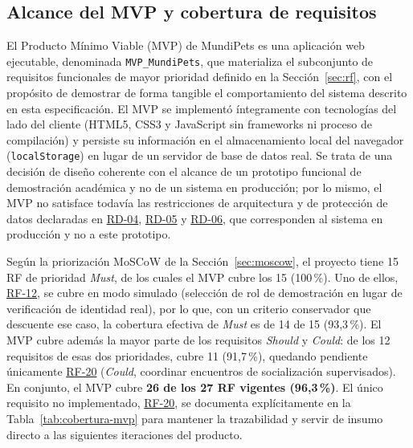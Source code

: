 \documentclass[journal,onecolumn]{IEEEtran}
\begin{document}
	\subsection{Alcance del MVP y cobertura de requisitos}
	\label{sec:mvp-alcance}
	
	El Producto Mínimo Viable (MVP) de MundiPets es una aplicación web
	ejecutable, denominada \texttt{MVP\_MundiPets}, que materializa el
	subconjunto de requisitos funcionales de mayor prioridad definido en la
	Sección~\ref{sec:rf}, con el propósito de demostrar de forma tangible el
	comportamiento del sistema descrito en esta especificación. El MVP se
	implementó íntegramente con tecnologías del lado del cliente (HTML5, CSS3 y
	JavaScript sin frameworks ni proceso de compilación) y persiste su
	información en el almacenamiento local del navegador
	(\texttt{localStorage}) en lugar de un servidor de base de datos real. Se
	trata de una decisión de diseño coherente con el alcance de un prototipo
	funcional de demostración académica y no de un sistema en producción; por
	lo mismo, el MVP no satisface todavía las restricciones de arquitectura y
	de protección de datos declaradas en \hyperref[tab:RD-04]{RD-04}, \hyperref[tab:RD-05]{RD-05} y \hyperref[tab:RD-06]{RD-06}, que
	corresponden al sistema en producción y no a este prototipo.
	
	Según la priorización MoSCoW de
	la Sección~\ref{sec:moscow}, el proyecto tiene 15 RF de prioridad
	\emph{Must}, de los cuales el MVP cubre los 15 (100\,\%). Uno de ellos,
	\hyperref[tab:RF-12]{RF-12}, se cubre en modo simulado (selección de rol de demostración en
	lugar de verificación de identidad real), por lo que, con un criterio
	conservador que descuente ese caso, la cobertura efectiva de \emph{Must}
	es de 14 de 15 (93,3\,\%). El MVP cubre además la mayor parte de los
	requisitos \emph{Should} y \emph{Could}: de los 12 requisitos de esas dos
	prioridades, cubre 11 (91,7\,\%), quedando pendiente únicamente \hyperref[tab:RF-20]{RF-20}
	(\emph{Could}, coordinar encuentros de socialización supervisados). En
	conjunto, el MVP cubre \textbf{26 de los 27 RF vigentes (96,3\,\%)}. El
	único requisito no implementado, \hyperref[tab:RF-20]{RF-20}, se documenta explícitamente en la
	Tabla~\ref{tab:cobertura-mvp} para mantener la trazabilidad y servir de
	insumo directo a las siguientes iteraciones del producto.
	
\end{document}
